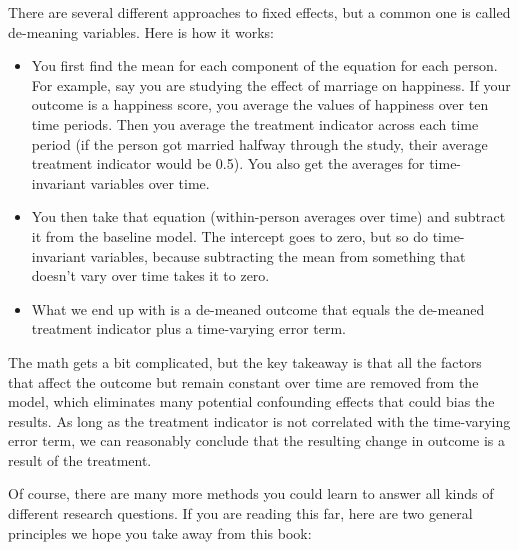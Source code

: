 \documentclass[
  letterpaper,
  DIV=11,
  numbers=noendperiod]{scrreprt}
\begin{document}
There are several different approaches to fixed effects, but a common
one is called de-meaning variables. Here is how it works:

\begin{itemize}
\item
  You first find the mean for each component of the equation for each
  person. For example, say you are studying the effect of marriage on
  happiness. If your outcome is a happiness score, you average the
  values of happiness over ten time periods. Then you average the
  treatment indicator across each time period (if the person got married
  halfway through the study, their average treatment indicator would be
  0.5). You also get the averages for time-invariant variables over
  time.
\item
  You then take that equation (within-person averages over time) and
  subtract it from the baseline model. The intercept goes to zero, but
  so do time-invariant variables, because subtracting the mean from
  something that doesn't vary over time takes it to zero.
\item
  What we end up with is a de-meaned outcome that equals the de-meaned
  treatment indicator plus a time-varying error term.
\end{itemize}

The math gets a bit complicated, but the key takeaway is that all the
factors that affect the outcome but remain constant over time are
removed from the model, which eliminates many potential confounding
effects that could bias the results. As long as the treatment indicator
is not correlated with the time-varying error term, we can reasonably
conclude that the resulting change in outcome is a result of the
treatment.

Of course, there are many more methods you could learn to answer all
kinds of different research questions. If you are reading this far, here
are two general principles we hope you take away from this book:
\end{document}
